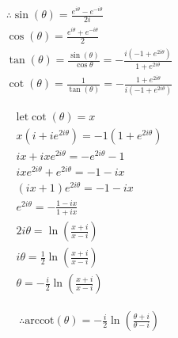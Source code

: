 \documentclass{../../style}
\begin{document}
\eulerformula

\begin{gather*}
	\therefore \sin(\theta) = \frac{e^{i\theta} - e^{-i\theta}}{2i} \\
	\cos(\theta) = \frac{e^{i\theta} + e^{-i\theta}}{2} \\
	\tan(\theta) = \frac{\sin(\theta)}{\cos{\theta}} = -\frac{i(-1 + e^{2i\theta})}{1 + e^{2i\theta}} \\
	\cot(\theta) = \frac{1}{\tan(\theta)} = -\frac{1 + e^{2i\theta}}{i(-1 + e^{2i\theta})}
\end{gather*}

\begin{gather*}
	\text{let} \cot(\theta) = x \\
	x(i + ie^{2i\theta}) = -1(1 + e^{2i\theta}) \\
	ix + ixe^{2i\theta} = -e^{2i\theta} - 1 \\
	ixe^{2i\theta} + e^{2i\theta} = -1 - ix \\
	(ix + 1)e^{2i\theta} = -1 - ix \\
	e^{2i\theta} = -\frac{1 - ix}{1 + ix} \\
	2i\theta = \ln(\frac{x + i}{x - i}) \\
	i\theta = \frac{1}{2}\ln(\frac{x + i}{x - i}) \\
	\theta = -\frac{i}{2}\ln(\frac{x + i}{x - i})
\end{gather*}

\begin{gather*}
	\therefore \text{arccot}(\theta) = -\frac{i}{2}\ln(\frac{\theta + i}{\theta - i})
\end{gather*}
\end{document}
